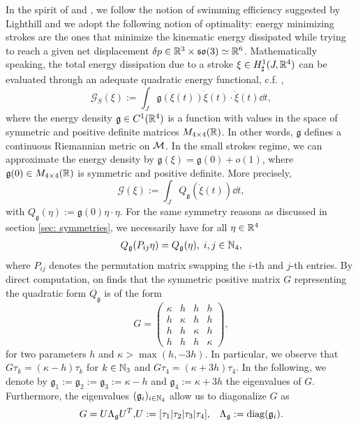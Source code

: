 \label{sec: optimization}
In the spirit of \cite{Alouges2013} and \cite{Alouges2017}, we follow the notion of swimming efficiency suggested by Lighthill \cite{Lighthill1952} and we adopt the following notion of optimality: energy minimizing strokes are the ones that minimize the kinematic energy dissipated while trying to reach a given net displacement $\delta p \in \mathbb{R}^3 \times \mathfrak{so}(3) \simeq \mathbb{R}^6$. Mathematically speaking, the total energy dissipation due to a stroke $\xi \in H^1_{\sharp}(J, \mathbb{R}^4)$ can be evaluated through an adequate quadratic energy functional, c.f. \cite{Alouges2013},
\begin{equation}
 \mathcal{G}_S(\xi) := \int_{J} \mathfrak{g}(\xi(t))\dot{\xi}(t) \cdot \dot{\xi}(t) \dd t,
\end{equation}
where the energy density $\mathfrak{g} \in C^1(\mathbb{R}^4)$ is a function with values in the space of symmetric and positive definite matrices $M_{4 \times 4}(\mathbb{R})$. In other words, $\mathfrak{g}$ defines a continuous Riemannian metric on $\mathcal{M}$. In the small strokes regime, we can approximate the energy density by $\mathfrak{g}(\xi) = \mathfrak{g}(0) + o(1)$, where $\mathfrak{g}(0) \in M_{4 \times 4}(\mathbb{R})$ is symmetric and positive definite. More precisely,
\begin{equation}
\label{eq: linearized energy functional}
	\mathcal{G}(\xi) := \int_{J} Q_{\mathfrak{g}}(\dot{\xi}(t))\dd t,
\end{equation}
with $Q_{\mathfrak{g}}(\eta) := \mathfrak{g}(0)\eta \cdot \eta$. For the same symmetry reasons as discussed in section \ref{sec: symmetries}, we necessarily have for all $\eta \in \mathbb{R}^4$
\begin{align}
	Q_{\mathfrak{g}}(P_{ij} \eta) = Q_{\mathfrak{g}}(\eta),\; i,j \in \mathbb{N}_4,
\end{align}
where $P_{ij}$ denotes the permutation matrix swapping the $i$-th and $j$-th entries. By direct computation, on finds that the symmetric positive matrix $G$ representing the quadratic form $Q_{\mathfrak{g}}$ is of the form
\begin{equation}
G = \left ( \begin{array}{cccc}
\kappa & h & h & h \\ 
h & \kappa & h & h \\ 
h & h & \kappa & h \\ 
h & h & h & \kappa
\end{array} \right ),
\end{equation}
for two parameters $h$ and $\kappa > \max(h, -3h)$. In particular, we observe that $G \tau_k = (\kappa - h ) \tau_k$ for $k \in  \mathbb{N}_3$ and $G \tau_4 = (\kappa + 3h) \tau_4$. In the following, we denote by $\mathfrak{g}_1 := \mathfrak{g}_2 := \mathfrak{g}_3 := \kappa - h$ and $\mathfrak{g}_4 := \kappa + 3h$ the eigenvalues of $G$. Furthermore, the eigenvalues $(\mathfrak{g}_i)_{i \in \mathbb{N}_4}$ allow us to diagonalize  $G$ as
\begin{eqnarray}
G = U \Lambda_{\mathfrak{g}} U^T, & U := [\tau_1 | \tau_2 |\tau_3 |\tau_4], & \Lambda_{\mathfrak{g}} := \operatorname{diag}(\mathfrak{g}_i).
\end{eqnarray}

